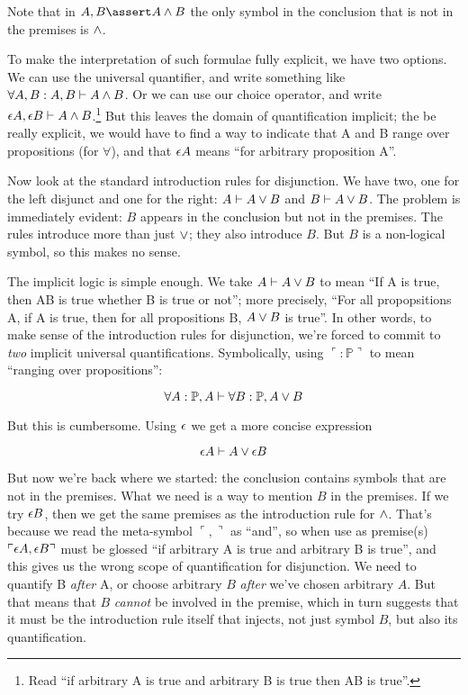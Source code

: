 \documentclass{article}
\begin{document}
Note that in \(A, B\linfer A\lkand B\) the only symbol in the
conclusion that is not in the premises is \(\land\).

To make the interpretation of such formulae fully explicit, we have
two options. We can use the universal quantifier, and write something
like \(\forall A, B: A, B\vdash A\land B\). Or we can use our choice
operator, and write \(\epsilon A, \epsilon B\vdash A\land
B\).\footnote{Read ``if arbitrary A is true and arbitrary B is true
then A\lkand B is true''.} But this leaves the domain of
quantification implicit; the be really explicit, we would have to find
a way to indicate that A and B range over propositions (for
\(\forall\)), and that \(\epsilon A\) means ``for arbitrary proposition
A''.

Now look at the standard introduction rules for disjunction. We have
two, one for the left disjunct and one for the right: \(A\vdash A\lor
B\) and \(B\vdash A\lor B\). The problem is immediately evident:
\(B\) appears in the conclusion but not in the premises. The rules
introduce more than just \(\lor\); they also introduce \(B\). But
\(B\) is a non-logical symbol, so this makes no sense.

The implicit logic is simple enough. We take \(A\vdash A\lor B\) to
mean ``If A is true, then A\lkor B is true whether B is true or not'';
more precisely, ``For all propopsitions A, if A is true, then for all
propositions B, \(A\lor B\) is true''. In other words, to make sense
of the introduction rules for disjunction, we're forced to commit to
\textit{two} implicit universal quantifications. Symbolically, using
\(\ulcorner :\mathbb{P}\urcorner\) to mean ``ranging over
propositions'':

\[\forall A:\mathbb{P}, A\vdash\forall B:\mathbb{P}, A\lor B\]

But this is cumbersome.  Using \(\epsilon\) we get a more concise expression

\[\epsilon A\vdash A\lor \epsilon B\]

But now we're back where we started: the conclusion contains symbols
that are not in the premises. What we need is a way to mention \(B\)
in the premises. If we try \(\epsilon B\), then we get the same
premises as the introduction rule for \(\land\). That's because we
read the meta-symbol \(\ulcorner ,\urcorner\) as ``and'', so when use
as premise(s) \(\ulcorner\epsilon A,\epsilon B\urcorner\) must be
glossed ``if arbitrary A is true and arbitrary B is true'', and this
gives us the wrong scope of quantification for disjunction. We need to
quantify B \textit{after} A, or choose arbitrary \(B\) \textit{after}
we've chosen arbitrary \(A\). But that means that \(B\)
\textit{cannot} be involved in the premise, which in turn suggests
that it must be the introduction rule itself that injects, not just
symbol \(B\), but also its quantification.
\end{document}
